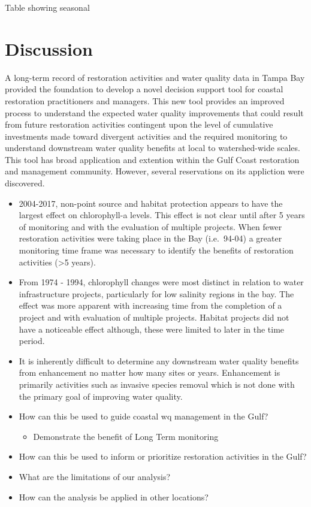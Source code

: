 \documentclass[]{article}
\providecommand{\tightlist}{%
  \setlength{\itemsep}{0pt}\setlength{\parskip}{0pt}}
\begin{document}
Table showing seasonal

\subsubsection{}\label{section}

\section{Discussion}\label{discussion}

A long-term record of restoration activities and water quality data in
Tampa Bay provided the foundation to develop a novel decision support
tool for coastal restoration practitioners and managers. This new tool
provides an improved process to understand the expected water quality
improvements that could result from future restoration activities
contingent upon the level of cumulative investments made toward
divergent activities and the required monitoring to understand
downstream water quality benefits at local to watershed-wide scales.
This tool has broad application and extention within the Gulf Coast
restoration and management community. However, several reservations on
its appliction were discovered.

\begin{itemize}
\item
  2004-2017, non-point source and habitat protection appears to have the
  largest effect on chlorophyll-a levels. This effect is not clear until
  after 5 years of monitoring and with the evaluation of multiple
  projects. When fewer restoration activities were taking place in the
  Bay (i.e.~94-04) a greater monitoring time frame was necessary to
  identify the benefits of restoration activities (\textgreater{}5
  years).
\item
  From 1974 - 1994, chlorophyll changes were most distinct in relation
  to water infrastructure projects, particularly for low salinity
  regions in the bay. The effect was more apparent with increasing time
  from the completion of a project and with evaluation of multiple
  projects. Habitat projects did not have a noticeable effect although,
  these were limited to later in the time period.
\item
  It is inherently difficult to determine any downstream water quality
  benefits from enhancement no matter how many sites or years.
  Enhancement is primarily activities such as invasive species removal
  which is not done with the primary goal of improving water quality.
\item
  How can this be used to guide coastal wq management in the Gulf?

  \begin{itemize}
  \tightlist
  \item
    Demonstrate the benefit of Long Term monitoring
  \end{itemize}
\item
  How can this be used to inform or prioritize restoration activities in
  the Gulf?
\item
  What are the limitations of our analysis?
\item
  How can the analysis be applied in other locations?
\end{itemize}
\end{document}
